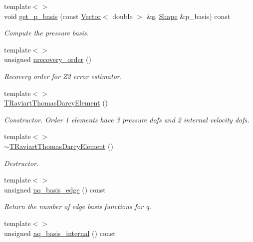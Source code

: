 \begin{DoxyCompactItemize}
{\footnotesize template$<$$>$ }\\void \hyperlink{classoomph_1_1TRaviartThomasDarcyElement_a4781dde90625537d52b7ca2eefaa0b18}{get\+\_\+p\+\_\+basis} (const \hyperlink{classoomph_1_1Vector}{Vector}$<$ double $>$ \&\hyperlink{cfortran_8h_ab7123126e4885ef647dd9c6e3807a21c}{s}, \hyperlink{classoomph_1_1Shape}{Shape} \&p\+\_\+basis) const
\begin{DoxyCompactList}\small\item\em Compute the pressure basis. \end{DoxyCompactList}\item 
{\footnotesize template$<$$>$ }\\unsigned \hyperlink{classoomph_1_1TRaviartThomasDarcyElement_ad885944cc8b00dec57f3f8178e41183f}{nrecovery\+\_\+order} ()
\begin{DoxyCompactList}\small\item\em Recovery order for Z2 error estimator. \end{DoxyCompactList}\item 
{\footnotesize template$<$$>$ }\\\hyperlink{classoomph_1_1TRaviartThomasDarcyElement_ac5f202910f2b9f07548e073fdfe282cb}{T\+Raviart\+Thomas\+Darcy\+Element} ()
\begin{DoxyCompactList}\small\item\em Constructor. Order 1 elements have 3 pressure dofs and 2 internal velocity dofs. \end{DoxyCompactList}\item 
{\footnotesize template$<$$>$ }\\\hyperlink{classoomph_1_1TRaviartThomasDarcyElement_ab36f29154094df22944c535f9d556495}{$\sim$\+T\+Raviart\+Thomas\+Darcy\+Element} ()
\begin{DoxyCompactList}\small\item\em Destructor. \end{DoxyCompactList}\item 
{\footnotesize template$<$$>$ }\\unsigned \hyperlink{classoomph_1_1TRaviartThomasDarcyElement_aeb3471d92cbe379e8c91dc6982c89e5f}{nq\+\_\+basis\+\_\+edge} () const
\begin{DoxyCompactList}\small\item\em Return the number of edge basis functions for q. \end{DoxyCompactList}\item 
{\footnotesize template$<$$>$ }\\unsigned \hyperlink{classoomph_1_1TRaviartThomasDarcyElement_a38c41f037fc2b1386011b2c5d67c3f4f}{nq\+\_\+basis\+\_\+internal} () const

\end{DoxyCompactItemize}
